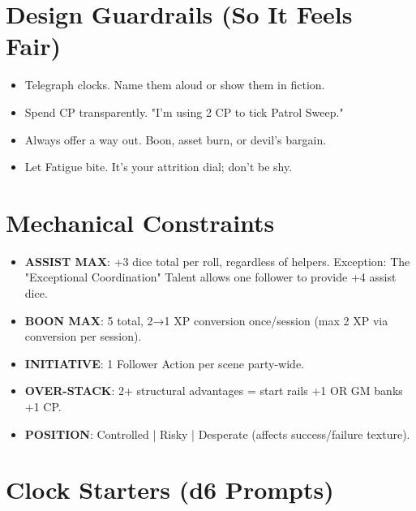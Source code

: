 \section{Design Guardrails (So It Feels Fair)}

\begin{itemize}
\item Telegraph clocks. Name them aloud or show them in fiction.
\item Spend CP transparently. "I'm using 2 CP to tick Patrol Sweep."
\item Always offer a way out. Boon, asset burn, or devil's bargain.
\item Let Fatigue bite. It's your attrition dial; don't be shy.
\end{itemize}

\section{Mechanical Constraints}
\begin{itemize}
    \item \textbf{ASSIST MAX}: +3 dice total per roll, regardless of helpers. Exception: The "Exceptional Coordination" Talent allows one follower to provide +4 assist dice.
    \item \textbf{BOON MAX}: 5 total, 2→1 XP conversion once/session (max 2 XP via conversion per session).
    \item \textbf{INITIATIVE}: 1 Follower Action per scene party-wide.
    \item \textbf{OVER-STACK}: 2+ structural advantages = start rails +1 OR GM banks +1 CP.
    \item \textbf{POSITION}: Controlled | Risky | Desperate (affects success/failure texture).
\end{itemize}

\section{Clock Starters (d6 Prompts)}

